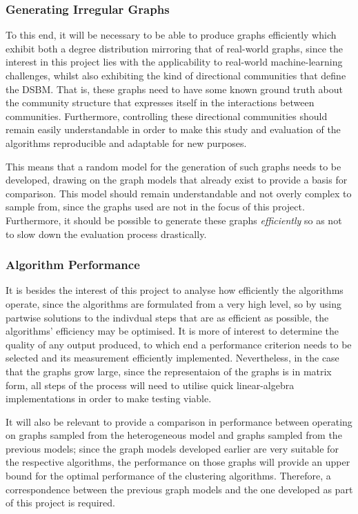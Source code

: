 \subsubsection{Generating Irregular Graphs}
To this end, it will be necessary to be able to produce graphs efficiently which exhibit both a 
degree distribution mirroring that of real-world graphs, since the interest in this project lies 
with the applicability to real-world machine-learning challenges, whilst also exhibiting the kind 
of directional communities that define the DSBM. That is, these graphs need to have some known
ground truth about the community structure that expresses itself in the interactions between 
communities. Furthermore, controlling these directional communities should remain easily 
understandable in order to make this study and evaluation of the algorithms reproducible and 
adaptable for new purposes. 

This means that a random model for the generation of such graphs needs to be developed, drawing on
the graph models that already exist to provide a basis for comparison. This model should remain 
understandable and not overly complex to sample from, since the graphs used are not in the focus of
this project. Furthermore, it should be possible to generate these graphs \emph{efficiently} so as
not to slow down the evaluation process drastically.

\subsubsection{Algorithm Performance}
It is besides the interest of this project to analyse how efficiently the algorithms operate, since
the algorithms are formulated from a very high level, so by using partwise solutions to the 
indivdual steps that are as efficient as possible, the algorithms' efficiency may be optimised. 
It is more of interest to determine the quality of any output produced, to which end a performance
criterion needs to be selected and its measurement efficiently implemented. Nevertheless, in the case
that the graphs grow large, since the representaion of the graphs is in matrix form, all steps of the
process will need to utilise quick linear-algebra implementations in order to make testing viable.

It will also be relevant to provide a comparison in performance between operating on graphs sampled
from the heterogeneous model and graphs sampled from the previous models; since the graph models
developed earlier are very suitable for the respective algorithms, the performance on those graphs
will provide an upper bound for the optimal performance of the clustering algorithms. Therefore, 
a correspondence between the previous graph models and the one developed as part of this project 
is required.

